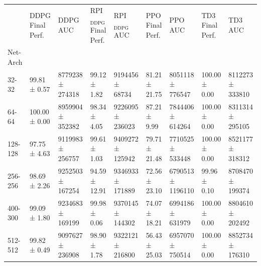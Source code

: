 \begin{tabular}{lllllllll}
\toprule
 & DDPG Final Perf. & DDPG AUC & RPI$_{\mathrm{DDPG}}$ Final Perf. & RPI$_{\mathrm{DDPG}}$ AUC & PPO Final Perf. & PPO AUC & TD3 Final Perf. & TD3 AUC \\
Net-Arch &  &  &  &  &  &  &  &  \\
\midrule
32-32 & 99.81 ± 0.57 & 8779238 ± 274318 & 99.12 ± 1.82 & 9194456 ± 68734 & 81.21 ± 21.75 & 8051118 ± 776547 & 100.00 ± 0.00 & 8112273 ± 333810 \\
64-64 & 100.00 ± 0.00 & 8959904 ± 352382 & 98.34 ± 4.05 & 9226095 ± 236023 & 87.21 ± 9.99 & 7844406 ± 614264 & 100.00 ± 0.00 & 8311314 ± 295105 \\
128-128 & 97.75 ± 4.63 & 9119983 ± 256757 & 99.61 ± 1.03 & 9409272 ± 125942 & 79.71 ± 21.48 & 7710525 ± 533448 & 100.00 ± 0.00 & 8521177 ± 318312 \\
256-256 & 98.69 ± 2.26 & 9252503 ± 167254 & 94.59 ± 12.91 & 9346933 ± 171889 & 72.56 ± 23.10 & 6790513 ± 1196110 & 99.96 ± 0.10 & 8708470 ± 199374 \\
400-300 & 99.09 ± 1.80 & 9234683 ± 169199 & 99.98 ± 0.06 & 9370145 ± 144302 & 74.07 ± 18.21 & 6994186 ± 631979 & 100.00 ± 0.00 & 8804610 ± 202492 \\
512-512 & 99.82 ± 0.49 & 9097627 ± 236908 & 98.90 ± 1.78 & 9322121 ± 216800 & 56.43 ± 25.03 & 6957070 ± 750514 & 100.00 ± 0.00 & 8852734 ± 176310 \\
\bottomrule
\end{tabular}
